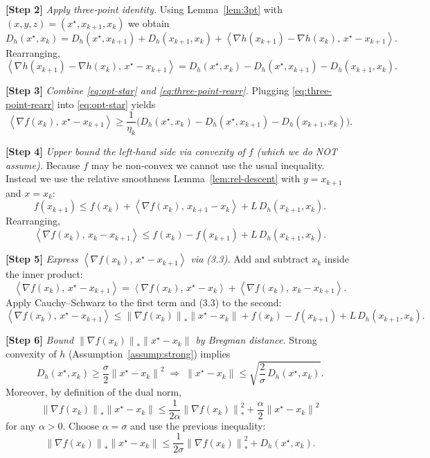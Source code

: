 \documentclass{article}
\newcommand{\norm}[1]{\left\|#1\right\|}
\newcommand{\inner}[2]{\left\langle #1,\,#2 \right\rangle}
\newcommand{\D}[2]{D_{h}(#1,#2)}
\newcommand{\grad}{\nabla}
\newcommand{\dualnorm}[1]{\left\|#1\right\|_{*}}
\begin{document}
\bigskip
\noindent\textbf{[Step 2]} \emph{Apply three‑point identity.}  
Using Lemma~\ref{lem:3pt} with $(x,y,z)=(x^\star,x_{k+1},x_k)$ we obtain
\[
\D{x^\star}{x_k}= \D{x^\star}{x_{k+1}}+\D{x_{k+1}}{x_k}
+\inner{\grad h(x_{k+1})-\grad h(x_k)}{x^\star-x_{k+1}} .
\]
Rearranging,
\begin{equation}
\label{eq:three-point-rearr}
\inner{\grad h(x_{k+1})-\grad h(x_k)}{x^\star-x_{k+1}}
= \D{x^\star}{x_k}-\D{x^\star}{x_{k+1}}-\D{x_{k+1}}{x_k}.
\end{equation}

\bigskip
\noindent\textbf{[Step 3]} \emph{Combine \eqref{eq:opt-star} and \eqref{eq:three-point-rearr}.}  
Plugging \eqref{eq:three-point-rearr} into \eqref{eq:opt-star} yields
\[
\inner{\grad f(x_k)}{x^\star-x_{k+1}}
\ge \frac{1}{\eta_k}\Big(
\D{x^\star}{x_k}-\D{x^\star}{x_{k+1}}-\D{x_{k+1}}{x_k}
\Big).
\tag{3.1}
\]

\bigskip
\noindent\textbf{[Step 4]} \emph{Upper bound the left‑hand side via convexity of $f$ (which we do NOT assume).}  
Because $f$ may be non‑convex we cannot use the usual inequality. Instead we use the relative smoothness Lemma~\ref{lem:rel-descent} with $y=x_{k+1}$ and $x=x_k$:
\[
f(x_{k+1}) \le f(x_k)+\inner{\grad f(x_k)}{x_{k+1}-x_k}+L\,\D{x_{k+1}}{x_k}.
\tag{3.2}
\]
Rearranging,
\[
\inner{\grad f(x_k)}{x_k-x_{k+1}} \le f(x_k)-f(x_{k+1})+L\,\D{x_{k+1}}{x_k}.
\tag{3.3}
\]

\bigskip
\noindent\textbf{[Step 5]} \emph{Express $\inner{\grad f(x_k)}{x^\star-x_{k+1}}$ via (3.3).}  
Add and subtract $x_k$ inside the inner product:
\[
\inner{\grad f(x_k)}{x^\star-x_{k+1}}
= \inner{\grad f(x_k)}{x^\star-x_k}
   +\inner{\grad f(x_k)}{x_k-x_{k+1}} .
\]
Apply Cauchy–Schwarz to the first term and (3.3) to the second:
\[
\inner{\grad f(x_k)}{x^\star-x_{k+1}}
\le \dualnorm{\grad f(x_k)}\norm{x^\star-x_k}
   + f(x_k)-f(x_{k+1})+L\,\D{x_{k+1}}{x_k}.
\tag{3.4}
\]

\bigskip
\noindent\textbf{[Step 6]} \emph{Bound $\dualnorm{\grad f(x_k)}\norm{x^\star-x_k}$ by Bregman distance.}  
Strong convexity of $h$ (Assumption~\ref{assump:strong}) implies
\[
\D{x^\star}{x_k}\ge \frac{\sigma}{2}\norm{x^\star-x_k}^{2}
\;\Longrightarrow\;
\norm{x^\star-x_k}\le \sqrt{\frac{2}{\sigma}\,\D{x^\star}{x_k}} .
\]
Moreover, by definition of the dual norm,
\[
\dualnorm{\grad f(x_k)}\norm{x^\star-x_k}
\le \frac{1}{2\alpha}\dualnorm{\grad f(x_k)}^{2}
    +\frac{\alpha}{2}\norm{x^\star-x_k}^{2}
\]
for any $\alpha>0$. Choose $\alpha=\sigma$ and use the previous inequality:
\[
\dualnorm{\grad f(x_k)}\norm{x^\star-x_k}
\le \frac{1}{2\sigma}\dualnorm{\grad f(x_k)}^{2}
    +\D{x^\star}{x_k}.
\tag{3.5}
\]
\end{document}
